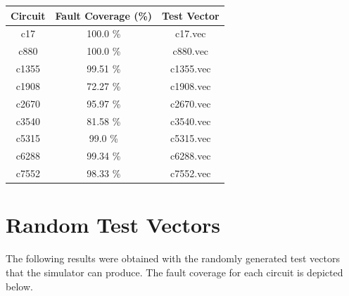 \documentclass[a4paper,12pt]{article}
\begin{document}
\begin{center}
\begin{tabular}{||c c c||}
\hline
Circuit & Fault Coverage (\%) & Test Vector \\ [0.5ex] 
\hline\hline
c17 & 100.0 \%  & c17.vec \\ 
\hline
c880 & 100.0 \%  & c880.vec \\ 
\hline
c1355 & 99.51 \%  & c1355.vec \\ 
\hline
c1908 & 72.27 \%  & c1908.vec \\ 
\hline
c2670 & 95.97 \%  & c2670.vec \\ 
\hline
c3540 & 81.58 \%  & c3540.vec \\ 
\hline
c5315 & 99.0 \%  & c5315.vec \\ 
\hline
c6288 & 99.34 \%  & c6288.vec \\ 
\hline
c7552 & 98.33 \%  & c7552.vec \\ 
\hline
\hline
\end{tabular}
\end{center}


\clearpage
\section*{Random Test Vectors}

The following results were obtained with the randomly generated test vectors that the simulator can produce. The fault coverage for each circuit is depicted below.
\end{document}
